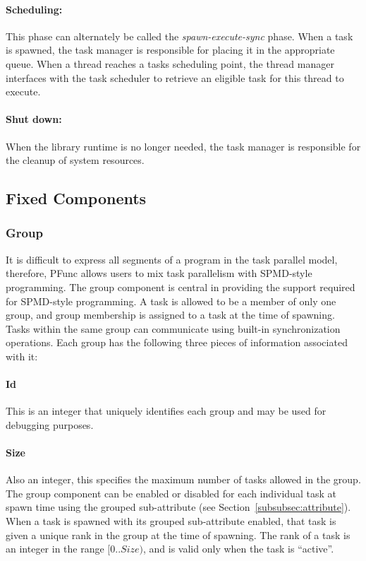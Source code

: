 \paragraph{Scheduling:} This phase can alternately be called the
\emph{spawn-execute-sync} phase. 
%
When a task is spawned, the task manager is responsible for placing it in the
appropriate queue.
%
When a thread reaches a tasks scheduling point, the thread manager interfaces
with the task scheduler to retrieve an eligible task for this thread to
execute.
%

\paragraph{Shut down:} When the library runtime is no longer needed,
the task manager is responsible for the cleanup of system resources.

\subsection{Fixed Components}
\label{subsec:fixed}

\subsubsection{Group}
\label{subsubsec:group}
%
It is difficult to express all segments of a program in the task parallel
model, therefore, PFunc allows users to mix task parallelism with SPMD-style
programming.
%
The group component is central in providing the support required for SPMD-style
programming. 
%
A task is allowed to be a member of only one group, and group membership is
assigned to a task at the time of spawning.
%
Tasks within the same group can communicate using built-in synchronization
operations. 
%
Each group has the following three pieces of information associated with it:

\paragraph{Id} This is an integer that uniquely identifies each group and
may be used for debugging purposes.
\paragraph{Size} Also an integer, this specifies the maximum number of
tasks allowed in the group.
%
The group component can be enabled or disabled for each individual task at
spawn time using the grouped sub-attribute (see
Section~\ref{subsubsec:attribute}).
%
When a task is spawned with its grouped sub-attribute enabled, that task is
given a unique rank in the group at the time of spawning.
%
The rank of a task is an integer in the range $[0..Size)$, and is valid only
when the task is ``active''.
